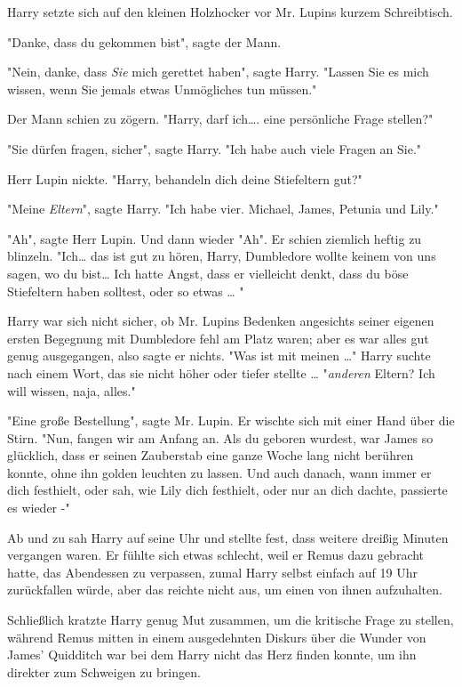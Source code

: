 {Harry setzte sich auf den kleinen Holzhocker vor Mr. Lupins kurzem Schreibtisch.

"Danke, dass du gekommen bist", sagte der Mann.

"Nein, danke, dass \emph{Sie} mich gerettet haben", sagte Harry. "Lassen Sie es mich wissen, wenn Sie jemals etwas Unmögliches tun müssen."

Der Mann schien zu zögern. "Harry, darf ich…. eine persönliche Frage stellen?"

"Sie dürfen fragen, sicher", sagte Harry. "Ich habe auch viele Fragen an Sie."

Herr Lupin nickte. "Harry, behandeln dich deine Stiefeltern gut?"

"Meine \emph{Eltern}", sagte Harry. "Ich habe vier. Michael, James, Petunia und Lily."

"Ah", sagte Herr Lupin. Und dann wieder "Ah". Er schien ziemlich heftig zu blinzeln. "Ich… das ist gut zu hören, Harry, Dumbledore wollte keinem von uns sagen, wo du bist… Ich hatte Angst, dass er vielleicht denkt, dass du böse Stiefeltern haben solltest, oder so etwas … "

Harry war sich nicht sicher, ob Mr. Lupins Bedenken angesichts seiner eigenen ersten Begegnung mit Dumbledore fehl am Platz waren; aber es war alles gut genug ausgegangen, also sagte er nichts. "Was ist mit meinen …" Harry suchte nach einem Wort, das sie nicht höher oder tiefer stellte … "\emph{anderen} Eltern? Ich will wissen, naja, alles."

"Eine große Bestellung", sagte Mr. Lupin. Er wischte sich mit einer Hand über die Stirn. "Nun, fangen wir am Anfang an. Als du geboren wurdest, war James so glücklich, dass er seinen Zauberstab eine ganze Woche lang nicht berühren konnte, ohne ihn golden leuchten zu lassen. Und auch danach, wann immer er dich festhielt, oder sah, wie Lily dich festhielt, oder nur an dich dachte, passierte es wieder -"

Ab und zu sah Harry auf seine Uhr und stellte fest, dass weitere dreißig Minuten vergangen waren. Er fühlte sich etwas schlecht, weil er Remus dazu gebracht hatte, das Abendessen zu verpassen, zumal Harry selbst einfach auf 19 Uhr zurückfallen würde, aber das reichte nicht aus, um einen von ihnen aufzuhalten.

Schließlich kratzte Harry genug Mut zusammen, um die kritische Frage zu stellen, während Remus mitten in einem ausgedehnten Diskurs über die Wunder von James' Quidditch war bei dem Harry nicht das Herz finden konnte, um ihn direkter zum Schweigen zu bringen.

}
